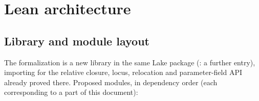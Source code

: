 \section{Lean architecture}
\label{sec:lean}

\subsection{Library and module layout}

The formalization is a new library  in the same Lake package
(: a further  entry), importing 
for the relative closure, locus, relocation and parameter-field API already proved
there.  Proposed modules, in dependency order (each corresponding to a part of this
document):

